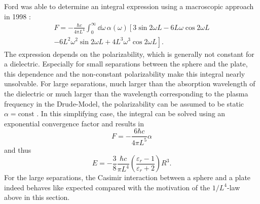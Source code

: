 Ford was able to determine an integral expression using a macroscopic approach in 1998 \cite{Ford_1998}:
\begin{multline}
  F = - \frac{\hbar c}{4 \pi L^4} \int_{0}^{\infty} \dd \omega \, \alpha(\omega) \left[3\sin 2 \omega L - 6L\omega \cos 2 \omega L \right. \\ 
  \left. - 6L^2\omega^2 \sin 2 \omega L + 4L^3\omega^3 \cos 2 \omega L\right].
\end{multline}
The expression depends on the polarizability, which is generally not constant for a dielectric. Especially for small separations between the sphere and the plate, this dependence and the non-constant polarizability make this integral nearly unsolvable.
For large separations, much larger than the absorption wavelength of the dielectric or much larger than the wavelength corresponding to the plasma frequency in the Drude-Model, the polarizability can be assumed to be static $\alpha=\mathrm{const}$ \cite{Ford_1998,Kamp_2020}. In this simplifying case, the integral can be solved using an exponential convergence factor and results in
\begin{equation}
  F = -\frac{6 \hbar c}{4 \pi L^5} \alpha
\end{equation}
and thus 
\begin{equation}\label{eq:3:casimir-sphere-plate}
  E = -\frac{3}{8}\frac{\hbar c}{\pi L^4} \left(\frac{\varepsilon_r - 1}{\varepsilon_r + 2}\right)R^3 .
\end{equation}
For the large separations, the Casimir interaction between a sphere and a plate indeed behaves like expected compared with the motivation of the $1/L^4$-law above in this section.

